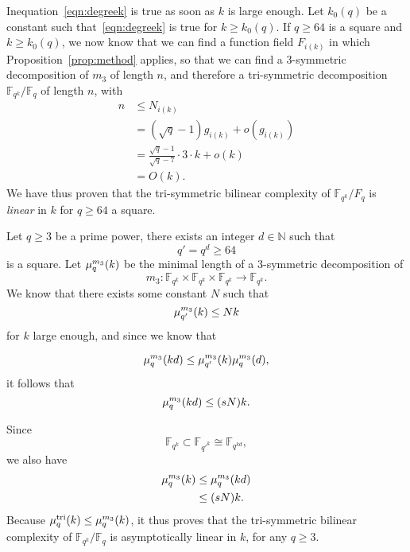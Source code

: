 \documentclass[a4paper,11pt]{article}
\begin{document}
Inequation~\eqref{eqn:degreek} is true as soon as $k$ is large enough. Let
$k_0(q)$ be a constant such that~\eqref{eqn:degreek} is true for $k\geq k_0(q)$.
If $q\geq 64$ is a square and $k\geq k_0(q)$, we now know that we can find a
function field $F_{i(k)}$ in which Proposition~\ref{prop:method}
applies, so that we can find a $3$-symmetric decomposition of $m_3$ of length
$n$, and therefore a tri-symmetric decomposition $\mathbb{F}_{q^k}/\mathbb{F}_q$ of length $n$, with
\begin{equation*}
  \begin{split}
    n&\leq N_{i(k)}\\
    &= (\sqrt q -1)g_{i(k)}+o(g_{i(k)})\\
    &= \frac{\sqrt q -1}{\sqrt q -7}\cdot3\cdot k+o(k)\\
    &= O(k).
  \end{split}
\end{equation*}
We have thus proven that the tri-symmetric bilinear complexity of
$\mathbb{F}_{q^k}/F_{q}$ is \emph{linear} in $k$ for $q\geq64$ a square.

Let $q\geq3$ be a prime power, there exists an integer $d\in\mathbb{N}$ such that
\[
  q' = q^d \geq 64
\]
is a square. Let $\mu_{q}^{m_3}(k)$ be the minimal length of a $3$-symmetric
decomposition of
\[
  m_3:\mathbb{F}_{q^{k}}\times\mathbb{F}_{q^k}\times\mathbb{F}_{q^k}\to\mathbb{F}_{q^k}.
\]
We know that there exists some constant
$N$ such that
\[
  \mu_{q'}^{m_3}(k)\leq Nk
\]
for $k$ large enough, and since we know that

\[
  \mu_{q}^{m_3}(kd)\leq\mu_{q'}^{m_3}(k)\mu_{q}^{m_3}(d),
\]
it follows that
\[
  \mu_{q}^{m_3}(kd) \leq (sN)k.
\]
\begin{center}
\end{center}
Since
\[
  \mathbb{F}_{q^k}\subset\mathbb{F}_{q'^k}\cong\mathbb{F}_{q^{kd}},
\]
we also have
\begin{equation*}
  \begin{split}
    \mu_{q}^{m_3}(k)&\leq\mu_{q}^{m_3}(kd)\\
    &\leq (sN)k.
  \end{split}
\end{equation*}
Because $\mu_{q}^{\text{tri}}(k)\leq\mu_{q}^{m_3}(k)$, it thus proves that the tri-symmetric bilinear complexity of
$\mathbb{F}_{q^k}/\mathbb{F}_q$ is asymptotically linear in $k$, for any $q\geq3$.



\end{document}
